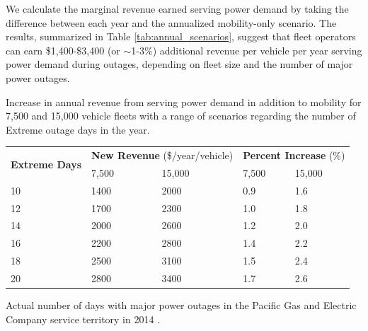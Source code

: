 \documentclass[journal]{IEEEtran}
\begin{document}
We calculate the marginal revenue earned serving power demand by taking the difference between each year and the annualized mobility-only scenario. The results, summarized in Table \ref{tab:annual_scenarios}, suggest that fleet operators can earn \$1,400-\$3,400 (or $\sim$1-3\%) additional revenue per vehicle per year serving power demand during outages, depending on fleet size and the number of major power outages.

\begin{threeparttable}[!htbp]
    \renewcommand{\arraystretch}{1}
    \caption{Increase in annual revenue from serving power demand in addition to mobility for 7,500 and 15,000 vehicle fleets with a range of scenarios regarding the number of Extreme outage days in the year.}
    \label{tab:annual_scenarios}
    \centering
    \def\colmargin{6.75cm}
    \footnotesize{
    \begin{tabular}{p{1cm}p{1cm}p{1cm}p{1cm}p{1cm}}
    \hline
    \multirow{2}{1cm}{\textbf{Extreme Days}} & \multicolumn{2}{c}{\textbf{New Revenue} (\$/year/vehicle)} & \multicolumn{2}{c}{\textbf{Percent Increase} (\%)} \\
    &7,500 & 15,000 & 7,500 & 15,000 \\
    \hline
    10 & 1400 & 2000 & 0.9 & 1.6 \\
    12 & 1700 & 2300 & 1.0 & 1.8 \\
    14 & 2000 & 2600 & 1.2 & 2.0 \\
    16\tnote{\textasteriskcentered} & 2200 & 2800 & 1.4 & 2.2 \\
    18 & 2500 & 3100 & 1.5 & 2.4 \\
    20 & 2800 & 3400 & 1.7 & 2.6 \\
    \hline
    \end{tabular}
      \begin{tablenotes}
        \footnotesize
        \item[\textasteriskcentered] Actual number of days with major power outages in the Pacific Gas and Electric Company service territory in 2014 \cite{pge_reliability_2014}.
      \end{tablenotes}}
\end{threeparttable}
\end{document}
